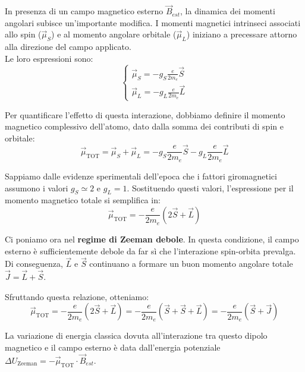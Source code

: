 In presenza di un campo magnetico esterno \( \vec{B}_{est} \), la dinamica dei momenti angolari subisce un'importante modifica. 
I momenti magnetici intrinseci associati allo spin (\( \vec{\mu}_S \)) e al momento angolare orbitale (\( \vec{\mu}_L \)) iniziano a precessare attorno alla direzione del campo applicato.\\
Le loro espressioni sono:
\begin{equation}
    \begin{cases}
    \vec{\mu}_S = -g_S \frac{e}{2m_e} \vec{S} \\[1ex]
    \vec{\mu}_L = -g_L \frac{e}{2m_e} \vec{L}
    \end{cases}
\end{equation}

Per quantificare l'effetto di questa interazione, dobbiamo definire il momento magnetico complessivo dell'atomo, dato dalla somma dei contributi di spin e orbitale:
\begin{equation}
    \vec{\mu}_{\text{TOT}} = \vec{\mu}_S + \vec{\mu}_L = -g_S \frac{e}{2m_e} \vec{S} - g_L \frac{e}{2m_e} \vec{L}
\end{equation}

Sappiamo dalle evidenze sperimentali dell'epoca che i fattori giromagnetici assumono i valori \( g_S \simeq 2 \) e \( g_L = 1 \). Sostituendo questi valori, l'espressione per il momento magnetico totale si semplifica in:
\begin{equation}
    \vec{\mu}_{\text{TOT}} = - \frac{e}{2m_e} (2\vec{S} + \vec{L})
\end{equation}

Ci poniamo ora nel \textbf{regime di Zeeman debole}. In questa condizione, il campo esterno è sufficientemente debole da far sì che l'interazione spin-orbita prevalga. 
Di conseguenza, \( \vec{L} \) e \( \vec{S} \) continuano a formare un buon momento angolare totale \( \vec{J} = \vec{L} + \vec{S} \). 

Sfruttando questa relazione, otteniamo:
\begin{equation}
    \vec{\mu}_{\text{TOT}} = - \frac{e}{2m_e} (2\vec{S} + \vec{L}) = - \frac{e}{2m_e} (\vec{S} + \vec{S} + \vec{L}) = - \frac{e}{2m_e} (\vec{S} + \vec{J})
\end{equation}

La variazione di energia classica dovuta all'interazione tra questo dipolo magnetico e il campo esterno è data dall'energia potenziale \( \Delta U_{\text{Zeeman}} = - \vec{\mu}_{\text{TOT}} \cdot \vec{B}_{est} \).

